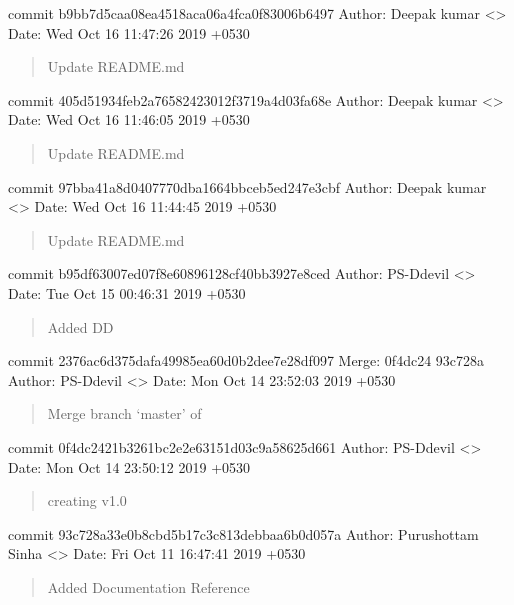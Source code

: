 \documentclass[letterpaper,10pt,english]{sphinxmanual}
\begin{document}
commit b9bb7d5caa08ea4518aca06a4fca0f83006b6497
Author: Deepak kumar \textless{}\textgreater{}
Date:   Wed Oct 16 11:47:26 2019 +0530
\begin{quote}

Update README.md
\end{quote}

commit 405d51934feb2a76582423012f3719a4d03fa68e
Author: Deepak kumar \textless{}\textgreater{}
Date:   Wed Oct 16 11:46:05 2019 +0530
\begin{quote}

Update README.md
\end{quote}

commit 97bba41a8d0407770dba1664bbceb5ed247e3cbf
Author: Deepak kumar \textless{}\textgreater{}
Date:   Wed Oct 16 11:44:45 2019 +0530
\begin{quote}

Update README.md
\end{quote}

commit b95df63007ed07f8e60896128cf40bb3927e8ced
Author: PS-Ddevil \textless{}\textgreater{}
Date:   Tue Oct 15 00:46:31 2019 +0530
\begin{quote}

Added DD
\end{quote}

commit 2376ac6d375dafa49985ea60d0b2dee7e28df097
Merge: 0f4dc24 93c728a
Author: PS-Ddevil \textless{}\textgreater{}
Date:   Mon Oct 14 23:52:03 2019 +0530
\begin{quote}

Merge branch ‘master’ of 
\end{quote}

commit 0f4dc2421b3261bc2e2e63151d03c9a58625d661
Author: PS-Ddevil \textless{}\textgreater{}
Date:   Mon Oct 14 23:50:12 2019 +0530
\begin{quote}

creating v1.0
\end{quote}

commit 93c728a33e0b8cbd5b17c3c813debbaa6b0d057a
Author: Purushottam Sinha \textless{}\textgreater{}
Date:   Fri Oct 11 16:47:41 2019 +0530
\begin{quote}

Added Documentation Reference
\end{quote}
\end{document}

